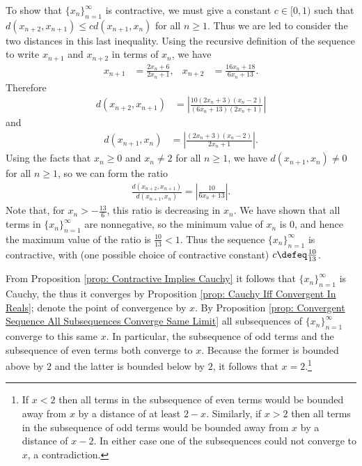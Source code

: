 To show that $\{ x_{n} \}_{n=1}^{\infty}$ is contractive, we must give a constant $c \in [0,1)$ such that $d(x_{n+2},x_{n+1}) \leq c d(x_{n+1},x_{n})$ for all $n \geq 1$. Thus we are led to consider the two distances in this last inequality. Using the recursive definition of the sequence to write $x_{n+1}$ and $x_{n+2}$ in terms of $x_{n}$, we have
\begin{align*}
x_{n+1} &= \frac{2 x_{n} + 6}{2 x_{n} + 1},
&
x_{n+2} &= \frac{16 x_{n} + 18}{6 x_{n} + 13}.
\end{align*}
Therefore
\begin{align*}
d(x_{n+2},x_{n+1}) &= \left| \frac{10 (2 x_{n} + 3) (x_{n} - 2)}{(6 x_{n} + 13) (2 x_{n} + 1)} \right|
\end{align*}
and
\begin{align*}
d(x_{n+1},x_{n}) &= \left| \frac{(2 x_{n} + 3) (x_{n} - 2)}{2 x_{n} + 1} \right|.
\end{align*}
Using the facts that $x_{n} \geq 0$ and $x_{n} \neq 2$ for all $n \geq 1$, we have $d(x_{n+1},x_{n}) \neq 0$ for all $n \geq 1$, so we can form the ratio
\begin{align*}
\frac{d(x_{n+2},x_{n+1})}{d(x_{n+1},x_{n})} = \left| \frac{10}{6 x_{n} + 13} \right|.
\end{align*}
Note that, for $x_{n} > -\frac{13}{6}$, this ratio is decreasing in $x_{n}$. We have shown that all terms in $\{ x_{n} \}_{n=1}^{\infty}$ are nonnegative, so the minimum value of $x_{n}$ is $0$, and hence the maximum value of the ratio is $\frac{10}{13} < 1$. Thus the sequence $\{ x_{n} \}_{n=1}^{\infty}$ is contractive, with (one possible choice of contractive constant) $c \defeq \frac{10}{13}$.

From Proposition \ref{prop: Contractive Implies Cauchy} it follows that $\{ x_{n} \}_{n=1}^{\infty}$ is Cauchy, the thus it converges by Proposition \ref{prop: Cauchy Iff Convergent In Reals}; denote the point of convergence by $x$. By Proposition \ref{prop: Convergent Sequence All Subsequences Converge Same Limit} all subsequences of $\{ x_{n} \}_{n=1}^{\infty}$ converge to this same $x$. In particular, the subsequence of odd terms and the subsequence of even terms both converge to $x$. Because the former is bounded above by $2$ and the latter is bounded below by $2$, it follows that $x = 2$.\footnote{If $x < 2$ then all terms in the subsequence of even terms would be bounded away from $x$ by a distance of at least $2 - x$. Similarly, if $x > 2$ then all terms in the subsequence of odd terms would be bounded away from $x$ by a distance of $x - 2$. In either case one of the subsequences could not converge to $x$, a contradiction.}



